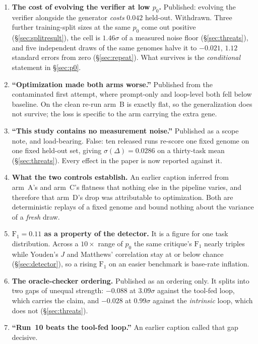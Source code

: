 \documentclass[11pt]{article}
\newcommand{\dd}{\ensuremath{\Delta}}
\begin{document}
\begin{enumerate}\itemsep2pt
  \item \textbf{The cost of evolving the verifier at low $p_0$.} Published: evolving the verifier
    alongside the generator \emph{costs} $0.042$ held-out. Withdrawn. Three further
    training-split sizes at the same $p_0$ come out positive
    (\S\ref{sec:splitresult}), the cell is $1.46\sigma$ of a measured noise floor
    (\S\ref{sec:threats}), and five independent draws of the same genomes halve it to $-0.021$,
    $1.12$ standard errors from zero (\S\ref{sec:repeat}). What survives is the
    \emph{conditional} statement in \S\ref{sec:p0}.
  \item \textbf{``Optimization made both arms worse.''} Published from the contaminated first
    attempt, where prompt-only and loop-level both fell below baseline. On the clean re-run
    arm~B is exactly flat, so the generalization does not survive; the loss is specific to the
    arm carrying the extra gene.
  \item \textbf{``This study contains no measurement noise.''} Published as a scope note, and
    load-bearing. False: ten released runs re-score one fixed genome on one fixed held-out set,
    giving $\sigma(\dd) = 0.0286$ on a thirty-task mean (\S\ref{sec:threats}). Every effect in
    the paper is now reported against it.
  \item \textbf{What the two controls establish.} An earlier caption inferred from arm~A's and
    arm~C's flatness that nothing else in the pipeline varies, and therefore that arm~D's drop
    was attributable to optimization. Both are deterministic replays of a fixed genome and bound
    nothing about the variance of a \emph{fresh} draw.
  \item \textbf{$\mathrm{F}_1 = 0.11$ as a property of the detector.} It is a figure for one task
    distribution. Across a $10\times$ range of $p_0$ the same critique's $\mathrm{F}_1$ nearly
    triples while Youden's $J$ and Matthews' correlation stay at or below chance
    (\S\ref{sec:detector}), so a rising $\mathrm{F}_1$ on an easier benchmark is base-rate
    inflation.
  \item \textbf{The oracle-checker ordering.} Published as an ordering only. It splits into two
    gaps of unequal strength: $-0.088$ at $3.09\sigma$ against the tool-fed loop, which carries
    the claim, and $-0.028$ at $0.99\sigma$ against the \emph{intrinsic} loop, which does not
    (\S\ref{sec:threats}).
  \item \textbf{``Run~10 beats the tool-fed loop.''} An earlier caption called that gap decisive.

\end{enumerate}
\end{document}
